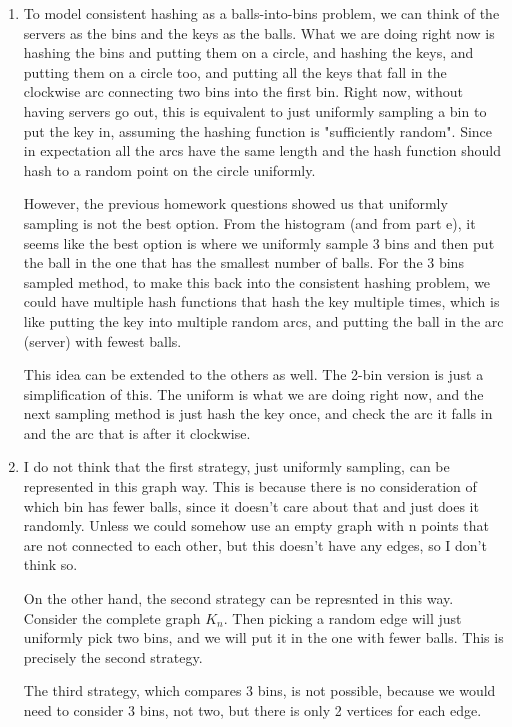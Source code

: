 \documentclass[12pt]{article}
\theoremstyle{definitionstyle}
\begin{document}
\begin{enumerate}[leftmargin=\labelsep]
\begin{enumerate}[label=(\alph*)]
            \item To model consistent hashing as a balls-into-bins problem, we can think of the servers as the bins and the keys as the balls. What we are doing right now is hashing the bins and putting them on a circle, and hashing the keys, and putting them on a circle too, and putting all the keys that fall in the clockwise arc connecting two bins into the first bin. Right now, without having servers go out, this is equivalent to just uniformly sampling a bin to put the key in, assuming the hashing function is "sufficiently random". Since in expectation all the arcs have the same length and the hash function should hash to a random point on the circle uniformly.

            However, the previous homework questions showed us that uniformly sampling is not the best option. From the histogram (and from part e), it seems like the best option is where we uniformly sample 3 bins  and then put the ball in the one that has the smallest number of balls. For the 3 bins sampled method, to make this back into the consistent hashing problem, we could have multiple hash functions that hash the key multiple times, which is like putting the key into multiple random arcs, and putting the ball in the arc (server) with fewest balls.

            This idea can be extended to the others as well. The 2-bin version is just a simplification of this. The uniform is what we are doing right now, and the next sampling method is just hash the key once, and check the arc it falls in and the arc that is after it clockwise.

            \item I do not think that the first strategy, just uniformly sampling, can be represented in this graph way. This is because there is no consideration of which bin has fewer balls, since it doesn't care about that and just does it randomly. Unless we could somehow use an empty graph with n points that are not connected to each other, but this doesn't have any edges, so I don't think so.

            On the other hand, the second strategy can be represnted in this way. Consider the complete graph $K_n$. Then picking a random edge will just uniformly pick two bins, and we will put it in the one with fewer balls. This is precisely the second strategy.

            The third strategy, which compares 3 bins, is not possible, because we would need to consider 3 bins, not two, but there is only 2 vertices for each edge.


\end{enumerate}
\end{enumerate}
\end{document}
